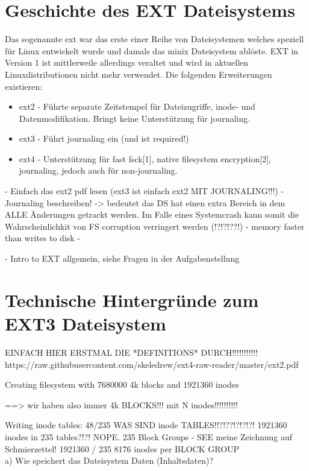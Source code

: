\section{Geschichte des EXT Dateisystems}

Das sogenannte \ac{ext} war das erste einer Reihe von Dateisystemen welches speziell für Linux entwickelt wurde und damals das minix Dateisystem ablöste. EXT in Version 1 ist mittlerweile allerdings veraltet und wird in aktuellen Linuxdistributionen nicht mehr verwendet. Die folgenden Erweiterungen existieren:

\begin{itemize}
	\item ext2 - Führte separate Zeitstempel für Dateizugriffe, inode- und Datenmodifikation. Bringt keine Unterstützung für journaling.
	\item ext3 - Führt journaling ein (und ist required!)
	\item ext4 - Unterstützung für fast fsck[1], native filesystem encryption[2], journaling, jedoch auch für non-journaling.
\end{itemize}

- Einfach das ext2 pdf lesen (ext3 ist einfach ext2 MIT JOURNALING!!!)
- Journaling beschreiben! -> bedeutet das DS hat einen extra Bereich in dem ALLE Änderungen getrackt werden. Im Falle eines Systemcrash kann somit die Wahrscheinlichkit von FS corruption verringert werden (!?!?!??!)
- memory faster than writes to disk
- 

- Intro to EXT allgemein, siehe Fragen in der Aufgabenstellung


\section{Technische Hintergründe zum EXT3 Dateisystem}

EINFACH HIER ERSTMAL DIE *DEFINITIONS* DURCH!!!!!!!!!!!
https://raw.githubusercontent.com/skeledrew/ext4-raw-reader/master/ext2.pdf

Creating filesystem with 7680000 4k blocks and 1921360 inodes

==> wir haben also immer 4k BLOCKS!!! mit N inodes!!!!!!!!!!

Writing inode tables:  48/235
WAS SIND inode TABLES!!?!??!?!?!?! 1921360 inodes in 235 tables?!?! NOPE. 235 Block Groups - SEE meine Zeichnung auf Schmierzettel!
1921360 / 235
8176 inodes per BLOCK GROUP
\\


a) Wie speichert das Dateisystem Daten (Inhaltsdaten)? 

